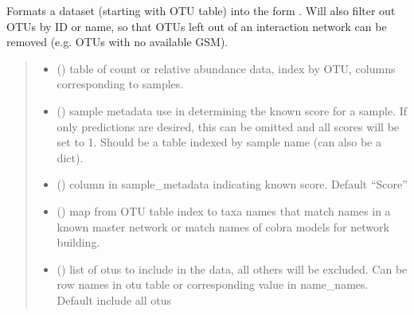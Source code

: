 \documentclass[letterpaper,10pt,english]{sphinxmanual}
\begin{document}
\begin{fulllineitems}
\label{\detokenize{format:format_data.format_data}}
\pysigstartsignatures
{}
\pysigstopsignatures
\sphinxAtStartPar
Formats a dataset (starting with OTU table) into the form . Will also filter out OTUs by ID or name, so that OTUs left out of an interaction network can be removed (e.g. OTUs with no available GSM).
\begin{quote}\begin{description}
\begin{itemize}
\item {} 
\sphinxAtStartPar
{} () \textendash{} table of count or relative abundance data, index by OTU, columns corresponding to samples.

\item {} 
\sphinxAtStartPar
{} () \textendash{} sample metadata use in determining the known score for a sample. If only predictions are desired, this can be omitted and all scores will be set to 1. Should be a table indexed by sample name (can also be a dict).

\item {} 
\sphinxAtStartPar
{} () \textendash{} column in sample\_metadata indicating known score. Default “Score”

\item {} 
\sphinxAtStartPar
{} () \textendash{} map from OTU table index to taxa names that match names in a known master network or match names of cobra models for network building.

\item {} 
\sphinxAtStartPar
{} () \textendash{} list of otus to include in the data, all others will be excluded. Can be row names in otu table or corresponding value in name\_names. Default include all otus


\end{itemize}
\end{description}
\end{quote}
\end{fulllineitems}
\end{document}
